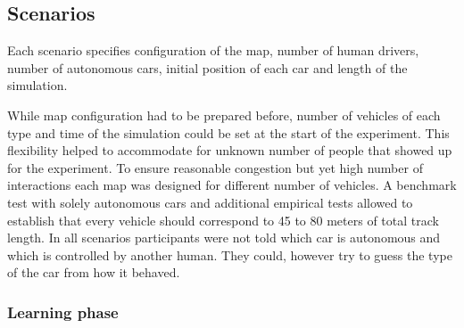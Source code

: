 \documentclass[11pt,english,twoside]{article}
\begin{document}




\subsection{Scenarios}

Each scenario specifies configuration of the map, number of human drivers, number of autonomous cars, initial position of each car and length of the simulation. 

While map configuration had to be prepared before, number of vehicles of each type and time of the simulation could be set at the start of the experiment. This flexibility helped to accommodate for unknown number of people that showed up for the experiment. To ensure reasonable congestion but yet high number of interactions each map was designed for different number of vehicles. A benchmark test with solely autonomous cars and additional empirical tests allowed to establish that every vehicle should correspond to 45 to 80 meters of total track length. In all scenarios participants were not told which car is autonomous and which is controlled by another human. They could, however try to guess the type of the car from how it behaved. 

\par


\subsubsection{Learning phase}
\end{document}
